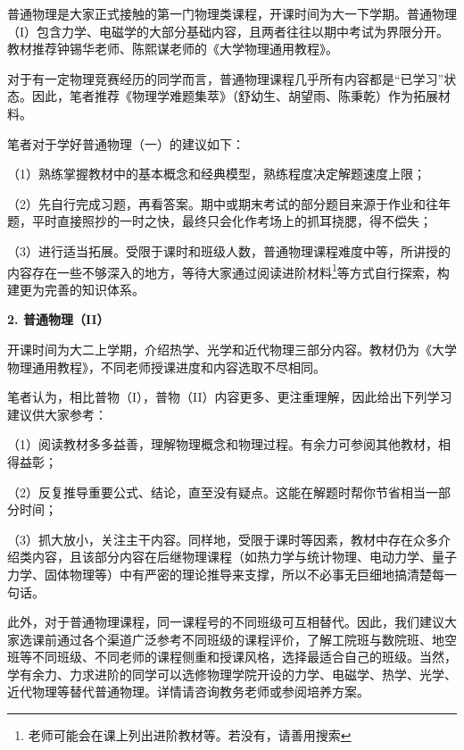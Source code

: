 \documentclass[11pt,oneside]{book}
\begin{document}
普通物理是大家正式接触的第一门物理类课程，开课时间为大一下学期。普通物理（I）包含力学、电磁学的大部分基础内容，且两者往往以期中考试为界限分开。教材推荐钟锡华老师、陈熙谋老师的《大学物理通用教程》。

对于有一定物理竞赛经历的同学而言，普通物理课程几乎所有内容都是“已学习”状态。因此，笔者推荐《物理学难题集萃》（舒幼生、胡望雨、陈秉乾）作为拓展材料。

\vspace{10pt}

笔者对于学好普通物理（一）的建议如下：

（1）熟练掌握教材中的基本概念和经典模型，熟练程度决定解题速度上限；

（2）先自行完成习题，再看答案。期中或期末考试的部分题目来源于作业和往年题，平时直接照抄的一时之快，最终只会化作考场上的抓耳挠腮，得不偿失；

（3）进行适当拓展。受限于课时和班级人数，普通物理课程难度中等，所讲授的内容存在一些不够深入的地方，等待大家通过阅读进阶材料\footnote{老师可能会在课上列出进阶教材等。若没有，请善用搜索}等方式自行探索，构建更为完善的知识体系。

\vspace{10pt}

\textbf{2. 普通物理（II）}

开课时间为大二上学期，介绍热学、光学和近代物理三部分内容。教材仍为《大学物理通用教程》，不同老师授课进度和内容选取不尽相同。

笔者认为，相比普物（I），普物（II）内容更多、更注重理解，因此给出下列学习建议供大家参考：

（1）阅读教材多多益善，理解物理概念和物理过程。有余力可参阅其他教材，相得益彰；

（2）反复推导重要公式、结论，直至没有疑点。这能在解题时帮你节省相当一部分时间；

（3）抓大放小，关注主干内容。同样地，受限于课时等因素，教材中存在众多介绍类内容，且该部分内容在后继物理课程（如热力学与统计物理、电动力学、量子力学、固体物理等）中有严密的理论推导来支撑，所以不必事无巨细地搞清楚每一句话。

\vspace{10pt}

此外，对于普通物理课程，同一课程号的不同班级可互相替代。因此，我们建议大家选课前通过各个渠道广泛参考不同班级的课程评价，了解工院班与数院班、地空班等不同班级、不同老师的课程侧重和授课风格，选择最适合自己的班级。当然，学有余力、力求进阶的同学可以选修物理学院开设的力学、电磁学、热学、光学、近代物理等替代普通物理。详情请咨询教务老师或参阅培养方案。
\end{document}
